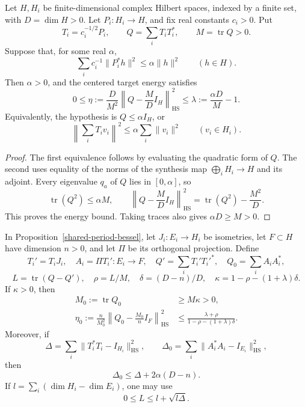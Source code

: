 \begin{proposition}\label{shared-period-bessel}
Let \(H,H_i\) be finite-dimensional complex Hilbert spaces, indexed by a
finite set, with \(D=\dim H>0\). Let \(P_i:H_i\to H\), and fix real
constants \(c_i>0\). Put
\[
 T_i=c_i^{-1/2}P_i,\qquad Q=\sum_iT_iT_i^*,\qquad
 M=\operatorname{tr}Q>0.
\]
Suppose that, for some real \(\alpha\),
\begin{equation}\label{shared-period-bessel-bound}
 \sum_i c_i^{-1}\|P_i^*h\|^2\le\alpha\|h\|^2
 \qquad(h\in H).
\end{equation}
Then \(\alpha>0\), and the centered target energy satisfies
\begin{equation}\label{shared-period-bessel-energy}
 0\le
 \eta:=\frac D{M^2}
       \left\|Q-\frac MD I_H\right\|_{\mathrm{HS}}^2
 \le\lambda:=\frac{\alpha D}{M}-1.
\end{equation}
Equivalently, the hypothesis is \(Q\le\alpha I_H\), or
\[
 \left\|\sum_iT_i v_i\right\|^2
       \le\alpha\sum_i\|v_i\|^2
       \qquad(v_i\in H_i).
\]
\end{proposition}

\begin{proof}
The first equivalence follows by evaluating the quadratic form of \(Q\).
The second uses equality of the norms of the synthesis map
\(\bigoplus_iH_i\to H\) and its adjoint. Every eigenvalue \(q_a\) of
\(Q\) lies in \([0,\alpha]\), so
\[
 \operatorname{tr}(Q^2)\le\alpha M,\qquad
 \left\|Q-\frac MD I_H\right\|_{\mathrm{HS}}^2
       =\operatorname{tr}(Q^2)-\frac{M^2}{D}.
\]
This proves the energy bound. Taking traces also gives
\(\alpha D\ge M>0\).
\end{proof}

\begin{proposition}
\label{shared-period-joint-restriction}
In Proposition~\ref{shared-period-bessel}, let \(J_i:E_i\to H_i\) be
isometries, let \(F\subset H\) have dimension \(n>0\), and let \(\Pi\)
be its orthogonal projection. Define
\[
 T_i'=T_iJ_i,\quad A_i=\Pi T_i':E_i\to F,\quad
 Q'=\sum_iT_i'T_i'^*,\quad Q_0=\sum_iA_iA_i^*,
\]
\[
 L=\operatorname{tr}(Q-Q'),\quad \rho=L/M,\quad
 \delta=(D-n)/D,\quad
 \kappa=1-\rho-(1+\lambda)\delta.
\]
If \(\kappa>0\), then
\begin{align}
 M_0:=\operatorname{tr}Q_0&\ge M\kappa>0,\label{shared-period-retained-mass}\\
 \eta_0:=
 \frac n{M_0^2}\left\|Q_0-\frac{M_0}{n}I_F\right\|_{\mathrm{HS}}^2
 &\le
 \frac{\lambda+\rho}{1-\rho-(1+\lambda)\delta}.
 \label{shared-period-retained-energy}
\end{align}
Moreover, if
\[
 \Delta=\sum_i\|T_i^*T_i-I_{H_i}\|_{\mathrm{HS}}^2,\qquad
 \Delta_0=\sum_i\|A_i^*A_i-I_{E_i}\|_{\mathrm{HS}}^2,
\]
then
\begin{equation}\label{shared-period-retained-diagonal}
 \Delta_0\le\Delta+2\alpha(D-n).
\end{equation}
If \(l=\sum_i(\dim H_i-\dim E_i)\), one may use
\begin{equation}\label{shared-period-discarded-mass}
 0\le L\le l+\sqrt{l\Delta}.
\end{equation}
\end{proposition}

